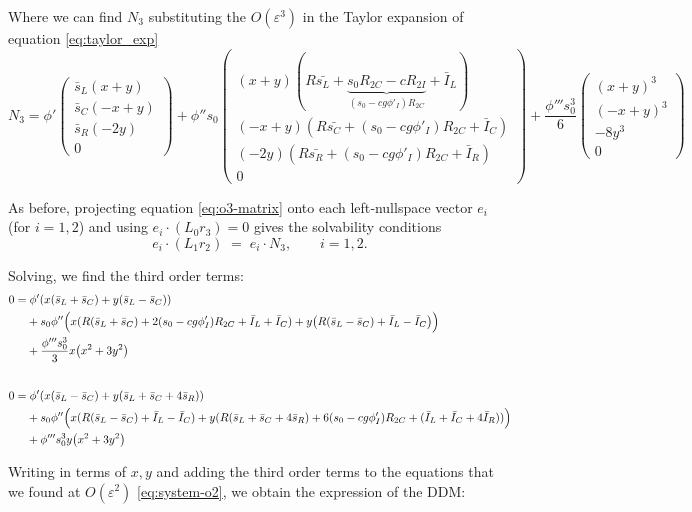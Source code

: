 \documentclass[../main.tex]{subfiles}
\begin{document}
Where we can find $N_3$ substituting the $O(\varepsilon^3)$ in the Taylor expansion of equation \ref{eq:taylor_exp} \, 
\[
N_3 = 
\phi'\begin{pmatrix}
\bar{s}_L(x+y)\\
\bar{s}_C(-x+y)\\ 
\bar{s}_R(-2y)\\ 
0
\end{pmatrix} +\phi''s_0\begin{pmatrix}
(x+y)(R\bar{s_L} + \underbrace{s_0R_{2C} - cR_{2I}}_{(s_0-cg\phi'_I)R_{2C}}+ \bar{I}_L)\\
(-x+y)(R\bar{s_C} +(s_0-cg\phi'_I)R_{2C}+ \bar{I}_C)\\ 
(-2y)(R\bar{s_R} +(s_0-cg\phi'_I)R_{2C} + \bar{I}_R)\\ 
0
\end{pmatrix} + \frac{\phi'''s_0^3}{6} 
\begin{pmatrix}
(x + y)^3\\  
(-x + y)^3\\  
-8y^3 \\ 
 0
\end{pmatrix}
\]

As before, projecting equation \eqref{eq:o3-matrix} onto each left‐nullspace vector \(e_i\) (for \(i=1,2\)) and using \(e_i\cdot(L_0r_3)=0\) gives the solvability conditions
\[
e_i\!\cdot\!(L_1r_2)\;=\;e_i\!\cdot\!N_3,
\qquad i=1,2.
\]

Solving, we find the third order terms:
\begin{equation}
\begin{aligned}
0 = & \; \phi'(x(\bar{s}_L+ \bar{s}_C)+y(\bar{s}_L -\bar{s}_C))\\
&+ s_0 \phi'' \Bigl( x(R(\bar{s}_L+\bar{s}_C)+2(s_0-cg\phi'_I)R_{2C}   + \bar{I}_L + \bar{I}_C)  + y\bigl(R(\bar{s}_L-\bar{s}_C) + \bar{I}_L - \bar{I}_C\bigr)\Bigr)\\
&+ \frac{\phi'''s_0^3}{3}  x\bigl(x^2+3y^2\bigr)\\[2em]
0 = &\; \phi'(x(\bar{s}_L- \bar{s}_C)+y(\bar{s}_L +\bar{s}_C+4\bar{s}_R))\\ 
& + s_0\phi'' \Bigl(x(R(\bar{s}_L-\bar{s}_C) + \bar{I}_L - \bar{I}_C) + y(R(\bar{s}_L+\bar{s}_C+ 4\bar{s}_R)+ 6(s_0-cg\phi'_I)R_{2C}  + (\bar{I}_L + \bar{I}_C + 4\bar{I}_R))\Bigr)\\
&+ \phi'''s_0^3 y\bigl(x^2+3y^2\bigr)
\notag
\end{aligned}
\end{equation}

Writing in terms of $x, y$ and adding the third order terms to the equations that we found at $O(\varepsilon^2)$  \eqref{eq:system-o2}, we obtain the expression of the DDM:
\end{document}
